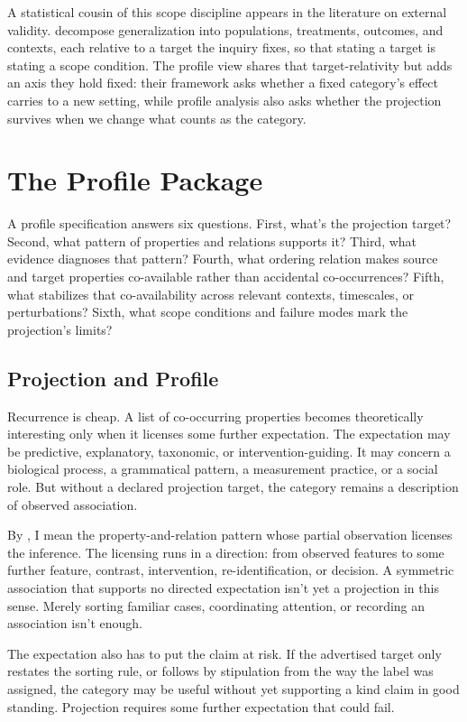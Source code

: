 \documentclass[12pt]{article}
\begin{document}
A statistical cousin of this scope discipline appears in the literature on
external validity. \textcite{egami2023elements} decompose generalization into
populations, treatments, outcomes, and contexts, each relative to a target the
inquiry fixes, so that stating a target is stating a scope condition. The profile
view shares that target-relativity but adds an axis they hold fixed: their
framework asks whether a fixed category's effect carries to a new setting, while
profile analysis also asks whether the projection survives when we change what
counts as the category.

\section{The Profile Package}

A profile specification answers six questions. First, what's the projection
target? Second, what pattern of properties and relations supports it? Third,
what evidence diagnoses that pattern? Fourth, what ordering relation makes
source and target properties co-available rather than accidental
co-occurrences? Fifth, what stabilizes that co-availability across relevant
contexts, timescales, or perturbations? Sixth, what scope conditions and
failure modes mark the projection's limits?

\subsection{Projection and Profile}

Recurrence is cheap. A list of co-occurring properties becomes theoretically
interesting only when it licenses some further expectation. The expectation may
be predictive, explanatory, taxonomic, or intervention-guiding. It may concern a
biological process, a grammatical pattern, a measurement practice, or a social
role. But without a declared projection target, the category remains a
description of observed association.

By , I mean the property-and-relation pattern whose partial
observation licenses the inference. The licensing runs in a direction: from
observed features to some further feature, contrast, intervention,
re-identification, or decision. A symmetric association that supports no directed
expectation isn't yet a projection in this sense. Merely sorting familiar cases,
coordinating attention, or recording an association isn't enough.

The expectation also has to put the claim at risk. If the advertised target
only restates the sorting rule, or follows by stipulation from the way the label
was assigned, the category may be useful without yet supporting a kind claim in
good standing. Projection requires some further expectation that could fail.
\end{document}
